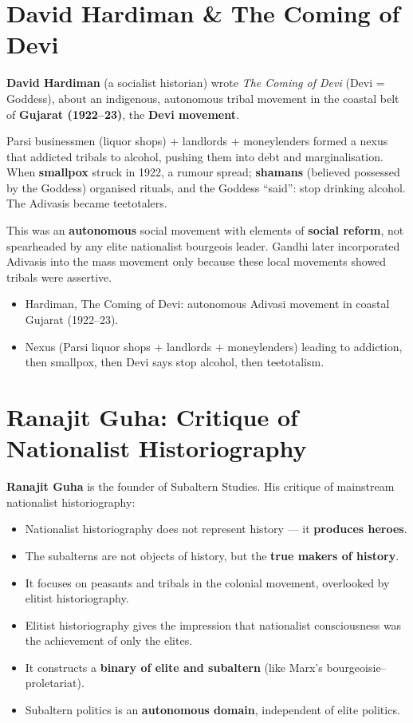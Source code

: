 \section{David Hardiman \& The Coming of Devi}

\textbf{David Hardiman} (a socialist historian) wrote \emph{The Coming of Devi} (Devi = Goddess), about an indigenous, autonomous tribal movement in the coastal belt of \textbf{Gujarat (1922--23)}, the \textbf{Devi movement}.

Parsi businessmen (liquor shops) + landlords + moneylenders formed a nexus that addicted tribals to alcohol, pushing them into debt and marginalisation. When \textbf{smallpox} struck in 1922, a rumour spread; \textbf{shamans} (believed possessed by the Goddess) organised rituals, and the Goddess ``said'': stop drinking alcohol. The Adivasis became teetotalers.

\begin{CriticalPoint}
This was an \textbf{autonomous} social movement with elements of \textbf{social reform}, not spearheaded by any elite nationalist bourgeois leader. Gandhi later incorporated Adivasis into the mass movement only because these local movements showed tribals were assertive.
\end{CriticalPoint}

\begin{QuickRevision}
\begin{itemize}
\item Hardiman, The Coming of Devi: autonomous Adivasi movement in coastal Gujarat (1922--23).
\item Nexus (Parsi liquor shops + landlords + moneylenders) leading to addiction, then smallpox, then Devi says stop alcohol, then teetotalism.
\end{itemize}
\end{QuickRevision}

\section{Ranajit Guha: Critique of Nationalist Historiography}

\textbf{Ranajit Guha} is the founder of Subaltern Studies. His critique of mainstream nationalist historiography:
\begin{itemize}
\item Nationalist historiography does not represent history --- it \textbf{produces heroes}.
\item The subalterns are not objects of history, but the \textbf{true makers of history}.
\item It focuses on peasants and tribals in the colonial movement, overlooked by elitist historiography.
\item Elitist historiography gives the impression that nationalist consciousness was the achievement of only the elites.
\item It constructs a \textbf{binary of elite and subaltern} (like Marx's bourgeoisie--proletariat).
\item Subaltern politics is an \textbf{autonomous domain}, independent of elite politics.
\end{itemize}

